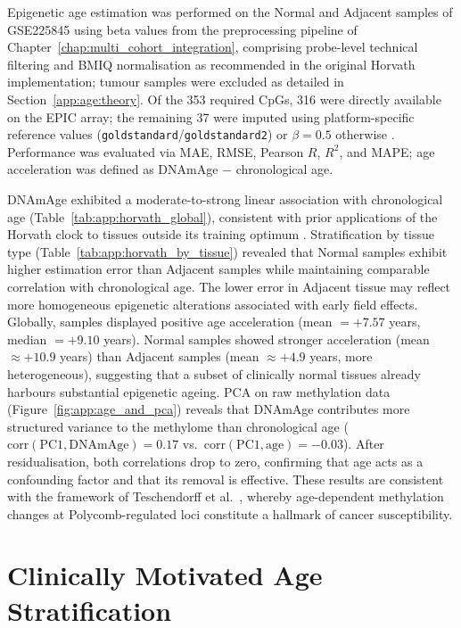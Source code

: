 Epigenetic age estimation was performed on the Normal and Adjacent samples of
GSE225845 using beta values from the preprocessing pipeline of
Chapter~\ref{chap:multi_cohort_integration}, comprising probe-level technical
filtering and BMIQ normalisation as recommended in the original Horvath
implementation; tumour samples were excluded as detailed in
Section~\ref{app:age:theory}. Of the 353 required CpGs, 316 were directly
available on the EPIC array; the remaining 37 were imputed using
platform-specific reference values (\texttt{goldstandard}/\texttt{goldstandard2})
or $\beta = 0.5$ otherwise \cite{Horvath2013}. Performance was evaluated via
MAE, RMSE, Pearson $R$, $R^2$, and MAPE; age acceleration was defined as
DNAmAge $-$ chronological age.

DNAmAge exhibited a moderate-to-strong linear association with chronological age
(Table~\ref{tab:app:horvath_global}), consistent with prior applications of the
Horvath clock to tissues outside its training optimum \cite{Horvath2013}.
Stratification by tissue type (Table~\ref{tab:app:horvath_by_tissue}) revealed
that Normal samples exhibit higher estimation error than Adjacent samples while
maintaining comparable correlation with chronological age. The lower error in
Adjacent tissue may reflect more homogeneous epigenetic alterations associated
with early field effects.
Globally, samples displayed positive age acceleration (mean $= +7.57$ years,
median $= +9.10$ years). Normal samples showed stronger acceleration (mean
$\approx +10.9$ years) than Adjacent samples (mean $\approx +4.9$ years, more
heterogeneous), suggesting that a subset of clinically normal tissues already
harbours substantial epigenetic ageing.
PCA on raw methylation data (Figure~\ref{fig:app:age_and_pca}) reveals that
DNAmAge contributes more structured variance to the methylome than chronological
age ($\text{corr}(\text{PC1}, \text{DNAmAge}) = 0.17$ vs.\
$\text{corr}(\text{PC1}, \text{age}) = -0.03$). After residualisation, both
correlations drop to zero, confirming that age acts as a confounding factor and
that its removal is effective. These results are consistent with the framework of
Teschendorff et al.~\cite{Teschendorff2010}, whereby age-dependent methylation
changes at Polycomb-regulated loci constitute a hallmark of cancer susceptibility.



\section{Clinically Motivated Age Stratification}
\label{app:age:binning}

